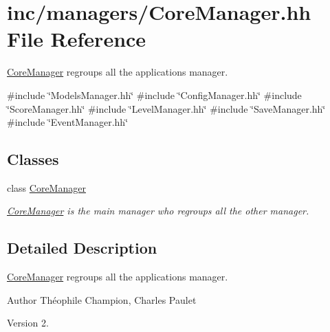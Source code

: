 \hypertarget{CoreManager_8hh}{}\section{inc/managers/\+Core\+Manager.hh File Reference}
\label{CoreManager_8hh}


\hyperlink{classCoreManager}{Core\+Manager} regroups all the application\textquotesingle{}s manager.  


{\ttfamily \#include \char`\"{}Models\+Manager.\+hh\char`\"{}}\newline
{\ttfamily \#include \char`\"{}Config\+Manager.\+hh\char`\"{}}\newline
{\ttfamily \#include \char`\"{}Score\+Manager.\+hh\char`\"{}}\newline
{\ttfamily \#include \char`\"{}Level\+Manager.\+hh\char`\"{}}\newline
{\ttfamily \#include \char`\"{}Save\+Manager.\+hh\char`\"{}}\newline
{\ttfamily \#include \char`\"{}Event\+Manager.\+hh\char`\"{}}\newline
\subsection*{Classes}
\begin{DoxyCompactItemize}
\item 
class \hyperlink{classCoreManager}{Core\+Manager}
\begin{DoxyCompactList}\small\item\em \hyperlink{classCoreManager}{Core\+Manager} is the main manager who regroups all the other manager. \end{DoxyCompactList}\end{DoxyCompactItemize}


\subsection{Detailed Description}
\hyperlink{classCoreManager}{Core\+Manager} regroups all the application\textquotesingle{}s manager. 

\begin{DoxyAuthor}{Author}
Théophile Champion, Charles Paulet 
\end{DoxyAuthor}
\begin{DoxyVersion}{Version}
2. 
\end{DoxyVersion}

